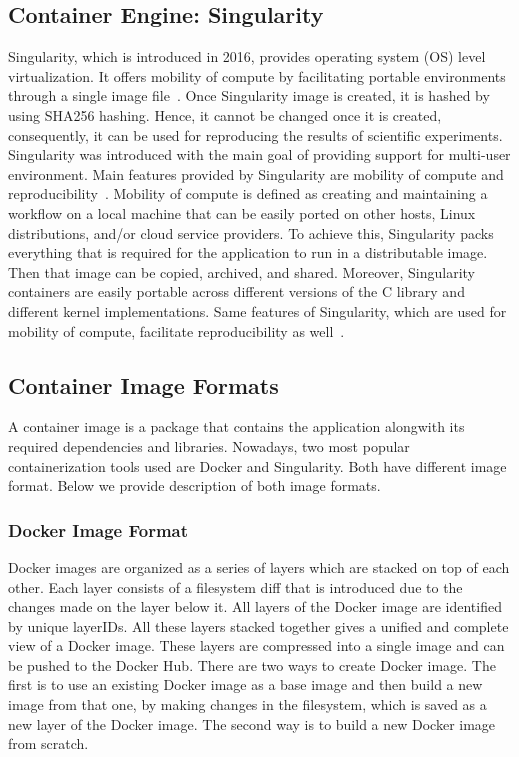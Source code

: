 \documentclass[a4paper,num-refs]{oup-contemporary}
\begin{document}
\subsection{Container Engine: Singularity}

Singularity, which is introduced in 2016, provides operating system (OS) level
virtualization.
It offers mobility of compute by facilitating portable environments 
through a single image file~\cite{kurtzer2016singularity}. Once Singularity image
is created, it is hashed by using SHA256 hashing. Hence, it cannot be changed
once it is created, consequently, it can be used for reproducing the results of
scientific experiments. Singularity was introduced with the main goal of
providing support for multi-user environment. Main features provided by
Singularity are mobility of compute and reproducibility~\cite{kurtzer2017singularity}.
Mobility of compute is defined as creating and maintaining a workflow on
a local machine that can be easily ported on other hosts, Linux distributions,
and/or cloud service providers. To achieve this, Singularity packs everything
that is required for the application to run in a distributable image. Then that
image can be copied, archived, and shared. Moreover, Singularity containers
are easily portable across different versions of the C library and different kernel
implementations.
Same features of Singularity, which are used for mobility of compute,
facilitate reproducibility as well~\cite{sochat2017enhancing}.

\subsection{Container Image Formats}

A container image is a package that contains the application alongwith its
required dependencies and libraries.
Nowadays, two most popular containerization tools used are Docker and Singularity.
Both have different image format. Below we provide description of both image
formats.

\subsubsection{Docker Image Format}

Docker images are organized as a series of layers which are stacked on top
of each other. Each layer consists of a filesystem diff that is introduced
due to the changes made on the layer below it. All layers of the Docker image
are identified by unique layerIDs. All these layers stacked together gives a
unified and complete view of a Docker image. These layers are
compressed into a single image and can be pushed to the Docker Hub.
There are two ways to create Docker image. The first is to use an existing
Docker image as a base image and then build a new image from that one, by
making changes in the filesystem, which is saved as a new layer of the
Docker image. The second way is to build a new Docker image from scratch.
\end{document}
